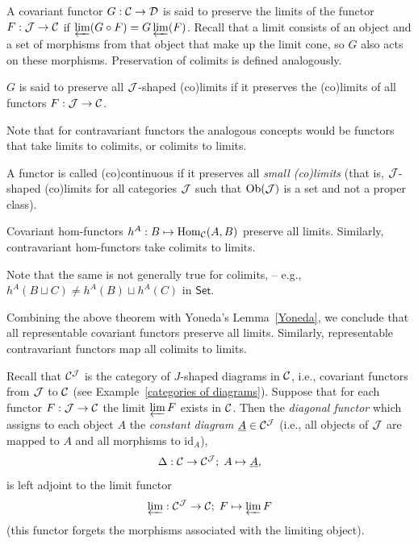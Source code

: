 \begin{defn}
    A covariant functor $G:\mathcal{C} \to\mathcal{D} $ is said to preserve the limits of the functor $F:\mathcal{J} \to \mathcal{C} $ if $\varprojlim(G\circ F)=G \varprojlim(F)$. Recall that a limit consists of an object and a set of morphisms from that object that make up the limit cone, so $G$ also acts on these morphisms. Preservation of colimits is defined analogously.

    $G$ is said to preserve all $\mathcal{J}$-shaped (co)limits if it preserves the (co)limits of all functors $F:\mathcal{J}\to \mathcal{C} $. 

    Note that for contravariant functors the analogous concepts would be functors that take limits to colimits, or colimits to limits.
\end{defn}    
\begin{defn}
    A functor is called (co)continuous if it preserves all \emph{small (co)limits} (that is, $\mathcal{J}$-shaped (co)limits for all categories $\mathcal{J}$ such that $\mathrm{Ob}(\mathcal{J})$ is a set and not a proper class).
\end{defn}
\begin{thm}
    Covariant hom-functors $h^A:B\mapsto\allowbreak \mathrm{Hom}_{\mathcal{C} }(A,B)$ preserve all limits. Similarly, contravariant hom-functors take colimits to limits.
\end{thm}
\begin{rem}
     Note that the same is not generally true for colimits, -- e.g., $h^A(B\sqcup C)\neq h^A(B)\sqcup h^A(C)$ in $\mathsf{Set}$.
\end{rem}
\begin{cor}
    Combining the above theorem with Yoneda's Lemma~\ref{Yoneda}, we conclude that all representable covariant functors preserve all limits. Similarly, representable contravariant functors map all colimits to limits.
\end{cor}
\begin{thm}\label{thm diagonal functor adjoint to limit}
    Recall that $\mathcal{C} ^{\mathcal{J}} $ is the category of $J$-shaped diagrams in $\mathcal{C} $, i.e., covariant functors from $\mathcal{J} $ to $\mathcal{C} $ (see Example~\ref{categories of diagrams}). Suppose that for each functor $F:\mathcal{J} \to\mathcal{C} $ the limit $\varprojlim F$ exists in $\mathcal{C} $. Then the \emph{diagonal functor} which assigns to each object $A$ the \emph{constant diagram} $\underline A\in \mathcal{C} ^{\mathcal{J}} $ (i.e., all objects of $\mathcal{J} $ are mapped to $A$ and all morphisms to $\mathrm{id}_A$),
    \[\Delta: \mathcal{C} \to \mathcal{C} ^{\mathcal{J} };\; A\mapsto \underline{A},\]
    is left adjoint to the limit functor
    \[\varprojlim: \mathcal{C} ^{\mathcal{J}} \to \mathcal{C} ;\; F\mapsto \varprojlim F\]
    (this functor forgets the morphisms associated with the limiting object).
\end{thm}
